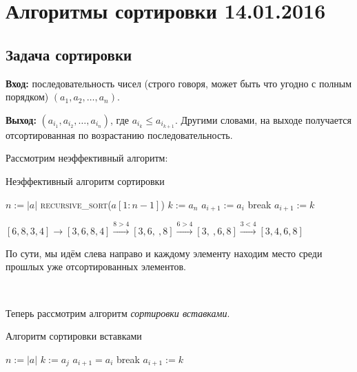 ﻿\section{Алгоритмы сортировки 14.01.2016}
\subsection*{Задача сортировки}
\textbf{Вход:} последовательность чисел (строго говоря, может быть что угодно с полным порядком) $(a_1, a_2, \ldots, a_n)$.

\textbf{Выход:} $(a_{i_1}, a_{i_2}, \ldots, a_{i_n})$, где $a_{i_k} \leq a_{i_{k+1}}$. Другими словами, на выходе получается отсортированная по возрастанию последовательность. 

Рассмотрим неэффективный алгоритм:

\begin{algorithm}
\caption{Неэффективный алгоритм сортировки}
\begin{algorithmic}[1]
\State $n \mathrel{:=} |a|$
    \State \textsc{recursive\_sort}($a[1:n-1]$)
    \State $k \mathrel{:=} a_n$
            \State $a_{i+1} \mathrel{:=} a_{i}$
        \Else
            \State break
        \EndIf
        \State $a_{i+1} \mathrel{:=} k$
    \EndFor
\EndIf
\EndFunction
\end{algorithmic}
\end{algorithm}

$[6,8,3,4] \to [3,6,8,4] \xrightarrow{8>4} [3,6,\ ,8] \xrightarrow{6>4}[3,\ ,6,8] \xrightarrow {3<4}[3,4,6,8]$

По сути, мы идём слева направо и каждому элементу находим место среди прошлых уже отсортированных элементов.

\

Теперь рассмотрим алгоритм \emph{сортировки вставками}.

\begin{algorithm}
\caption{Алгоритм сортировки вставками}
\begin{algorithmic}[1]
\State $n \mathrel{:=} |a|$
    \State $k \mathrel{:=} a_j$
            \State $a_{i+1} = a_i$
        \Else
            \State break
        \EndIf
        \State $a_{i+1} \mathrel{:=} k$
    \EndFor
\EndFor
\EndFunction
\end{algorithmic}
\end{algorithm}

